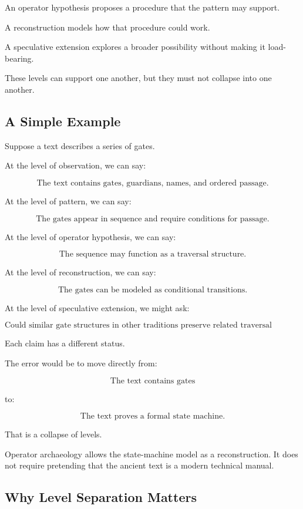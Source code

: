 \documentclass[11pt]{book}
\begin{document}
An operator hypothesis proposes a procedure that the pattern may support.

A reconstruction models how that procedure could work.

A speculative extension explores a broader possibility without making it load-bearing.

These levels can support one another, but they must not collapse into one another.

\subsection{A Simple Example}

Suppose a text describes a series of gates.

At the level of observation, we can say:

\[
\text{The text contains gates, guardians, names, and ordered passage.}
\]

At the level of pattern, we can say:

\[
\text{The gates appear in sequence and require conditions for passage.}
\]

At the level of operator hypothesis, we can say:

\[
\text{The sequence may function as a traversal structure.}
\]

At the level of reconstruction, we can say:

\[
\text{The gates can be modeled as conditional transitions.}
\]

At the level of speculative extension, we might ask:

\[
\text{Could similar gate structures in other traditions preserve related traversal grammars?}
\]

Each claim has a different status.

The error would be to move directly from:

\[
\text{The text contains gates}
\]

to:

\[
\text{The text proves a formal state machine.}
\]

That is a collapse of levels.

Operator archaeology allows the state-machine model as a reconstruction. It does not require pretending that the ancient text is a modern technical manual.

\subsection{Why Level Separation Matters}
\end{document}
